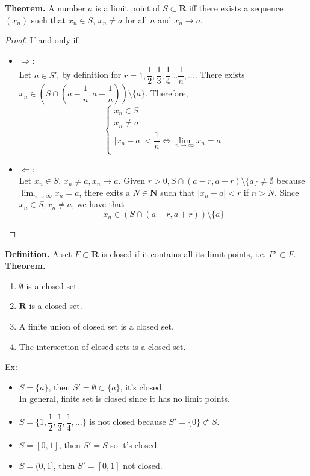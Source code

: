 \documentclass[10pt,letterpaper]{article}
\begin{document}
	\textbf{Theorem. } A number $a$ is a limit point of $S \subset \mathbf{R}$ iff 
	there exists a sequence $(x_n)$ such that $x_n \in S$, $x_n \neq a$ for all $n$ and
	$x_n \rightarrow a$.
	\begin{proof}
		If and only if
		\begin{itemize}
		\item $\Rightarrow$: \\
		Let $a \in S'$, by definition for $r = 1, \dfrac{1}{2}, \dfrac{1}{3}, \dfrac{1}{4} \ldots \dfrac{1}{n},
		\ldots$. There exists $x_n \in (S \cap (a - \dfrac{1}{n}, a + \dfrac{1}{n})) \setminus \{a\}$.
		Therefore, 
		$$
		\begin{cases}
			x_n \in S \\
			x_n \neq a \\
			|x_n - a| < \dfrac{1}{n} \Leftrightarrow \displaystyle\lim_{n\to\infty}x_n = a	\\
		\end{cases}
		$$
		\item $\Leftarrow$: \\ 
		Let $x_n \in S$, $x_n \neq a, x_n \rightarrow a$. Given $r > 0, S \cap (a - r, a + r) \setminus \{a\} \neq \emptyset$
		because $\displaystyle\lim_{n\to\infty}x_n = a$, there exits a $N \in \mathbf{N}$ such that
		$|x_n - a| < r$ if $n > N$. Since $x_n \in S, x_n \neq a$, we have that 
		$$x_n \in (S \cap (a - r, a + r)) \setminus \{a\}$$
		\end{itemize}
	\end{proof}
	\textbf{Definition. } A set $F \subset \mathbf{R}$ is closed if it contains all its limit points, i.e.
	$F' \subset F$. \\
	
	\textbf{Theorem. } 
	\begin{enumerate}
		\item $\emptyset$ is a closed set.
		\item $\mathbf{R}$ is a closed set.
		\item A finite union of closed set is a closed set.
		\item The intersection of closed sets is a closed set. 
	\end{enumerate}
	
	Ex: \\
	\begin{itemize}
		\item $S = \{a\}$, then $S' = \emptyset \subset \{a\}$, it's closed. \\
		In general, finite set is closed since it has no limit points. 
		\item $S = \{1, \dfrac{1}{2}, \dfrac{1}{3}, \dfrac{1}{4}, \ldots \}$ is not closed because
		$S' = \{0\} \not\subset S$.
		\item $S = [0, 1]$, then $S' = S$ so it's closed.
		\item $S = (0, 1]$, then $S' = [0, 1]$ not closed.
	\end{itemize}
	
\end{document}
